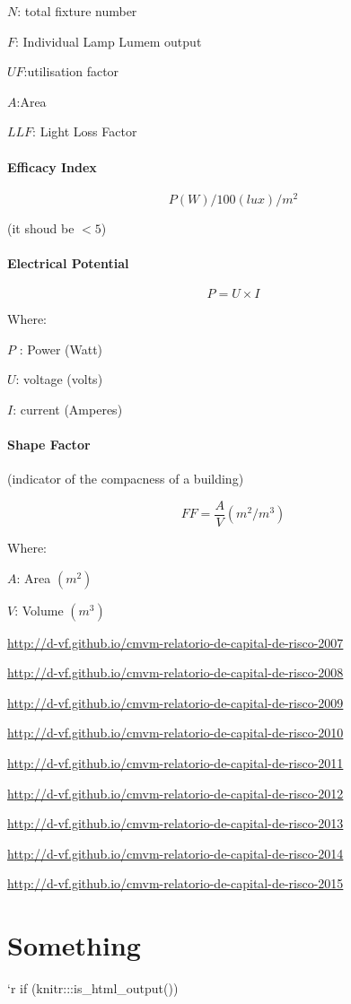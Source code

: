 \documentclass[]{book}
\theoremstyle{definition}
\theoremstyle{definition}
\theoremstyle{definition}
\theoremstyle{remark}
\begin{document}
\(N\): total fixture number

\(F\): Individual Lamp Lumem output

\(UF\):utilisation factor

\(A\):Area

\(LLF\): Light Loss Factor

\subsubsection{Efficacy Index}\label{efficacy-index}

\[P(W)/100 (lux)/m^2\]

(it shoud be \(<5\))

\subsubsection{Electrical Potential}\label{electrical-potential}

\[P = U\times I\]

Where:

\(P\) : Power (Watt)

\(U\): voltage (volts)

\(I\): current (Amperes)

\subsubsection{Shape Factor}\label{shape-factor}

(indicator of the compacness of a building)

\[FF= \frac{A}{V}(m^2/ m^3)\]

Where:

\(A\): Area \((m^2)\)

\(V\): Volume \((m^3)\)

\url{http://d-vf.github.io/cmvm-relatorio-de-capital-de-risco-2007}

\url{http://d-vf.github.io/cmvm-relatorio-de-capital-de-risco-2008}

\url{http://d-vf.github.io/cmvm-relatorio-de-capital-de-risco-2009}

\url{http://d-vf.github.io/cmvm-relatorio-de-capital-de-risco-2010}

\url{http://d-vf.github.io/cmvm-relatorio-de-capital-de-risco-2011}

\url{http://d-vf.github.io/cmvm-relatorio-de-capital-de-risco-2012}

\url{http://d-vf.github.io/cmvm-relatorio-de-capital-de-risco-2013}

\url{http://d-vf.github.io/cmvm-relatorio-de-capital-de-risco-2014}

\url{http://d-vf.github.io/cmvm-relatorio-de-capital-de-risco-2015}

\chapter{Something}\label{something}

`r if (knitr:::is\_html\_output())


\end{document}
